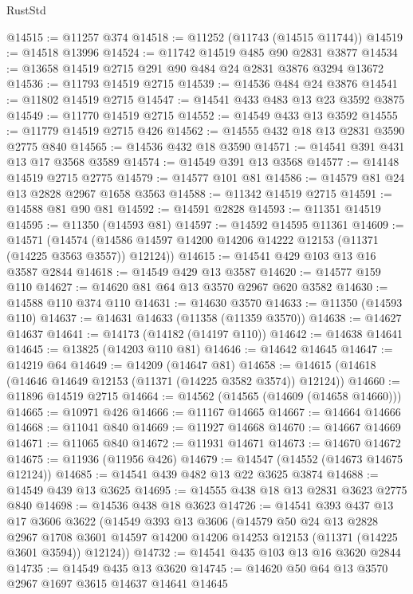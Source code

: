 \begin{lexlean}{RustStd}
\begin{coremodule}
{\begin{coremodule}
{{{{{{{{{{{{{{{{{{{{{{{{{{{{{{{{{@14515 := @11257 @374
@14518 := @11252 (@11743 (@14515 @11744))
@14519 := @14518 @13996
@14524 := @11742 @14519 @485 @90 @2831 @3877
@14534 := @13658 @14519 @2715 @291 @90 @484 @24 @2831 @3876 @3294 @13672
@14536 := @11793 @14519 @2715
@14539 := @14536 @484 @24 @3876
@14541 := @11802 @14519 @2715
@14547 := @14541 @433 @483 @13 @23 @3592 @3875
@14549 := @11770 @14519 @2715
@14552 := @14549 @433 @13 @3592
@14555 := @11779 @14519 @2715 @426
@14562 := @14555 @432 @18 @13 @2831 @3590 @2775 @840
@14565 := @14536 @432 @18 @3590
@14571 := @14541 @391 @431 @13 @17 @3568 @3589
@14574 := @14549 @391 @13 @3568
@14577 := @14148 @14519 @2715 @2775
@14579 := @14577 @101 @81
@14586 := @14579 @81 @24 @13 @2828 @2967 @1658 @3563
@14588 := @11342 @14519 @2715
@14591 := @14588 @81 @90 @81
@14592 := @14591 @2828
@14593 := @11351 @14519
@14595 := @11350 (@14593 @81)
@14597 := @14592 @14595 @11361
@14609 := @14571
    (@14574 (@14586 @14597 @14200 @14206 @14222 @12153 (@11371 (@14225 @3563 @3557)) @12124))
@14615 := @14541 @429 @103 @13 @16 @3587 @2844
@14618 := @14549 @429 @13 @3587
@14620 := @14577 @159 @110
@14627 := @14620 @81 @64 @13 @3570 @2967 @620 @3582
@14630 := @14588 @110 @374 @110
@14631 := @14630 @3570
@14633 := @11350 (@14593 @110)
@14637 := @14631 @14633 (@11358 (@11359 @3570))
@14638 := @14627 @14637
@14641 := @14173 (@14182 (@14197 @110))
@14642 := @14638 @14641
@14645 := @13825 (@14203 @110 @81)
@14646 := @14642 @14645
@14647 := @14219 @64
@14649 := @14209 (@14647 @81)
@14658 := @14615 (@14618 (@14646 @14649 @12153 (@11371 (@14225 @3582 @3574)) @12124))
@14660 := @11896 @14519 @2715
@14664 := @14562 (@14565 (@14609 (@14658 @14660)))
@14665 := @10971 @426
@14666 := @11167 @14665
@14667 := @14664 @14666
@14668 := @11041 @840
@14669 := @11927 @14668
@14670 := @14667 @14669
@14671 := @11065 @840
@14672 := @11931 @14671
@14673 := @14670 @14672
@14675 := @11936 (@11956 @426)
@14679 := @14547 (@14552 (@14673 @14675 @12124))
@14685 := @14541 @439 @482 @13 @22 @3625 @3874
@14688 := @14549 @439 @13 @3625
@14695 := @14555 @438 @18 @13 @2831 @3623 @2775 @840
@14698 := @14536 @438 @18 @3623
@14726 := @14541
    @393
    @437
    @13
    @17
    @3606
    @3622
    (@14549
      @393
      @13
      @3606
      (@14579
        @50
        @24
        @13
        @2828
        @2967
        @1708
        @3601
        @14597
        @14200
        @14206
        @14253
        @12153
        (@11371 (@14225 @3601 @3594))
        @12124))
@14732 := @14541 @435 @103 @13 @16 @3620 @2844
@14735 := @14549 @435 @13 @3620
@14745 := @14620 @50 @64 @13 @3570 @2967 @1697 @3615 @14637 @14641 @14645
}}}}}}}}}}}}}}}}}}}}}}}}}}}}}}}}}
\end{coremodule}}
\end{coremodule}
\end{lexlean}
